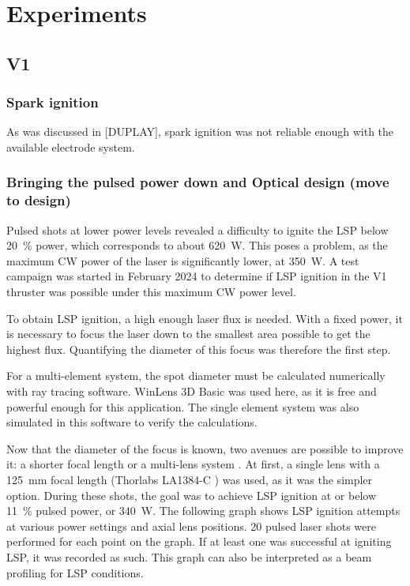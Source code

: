 \chapter{Experiments}

    \section{V1}

        \subsection{Spark ignition}
            
            As was discussed in [DUPLAY], spark ignition was not reliable enough with the available electrode system. 

        \subsection{Bringing the pulsed power down and Optical design (move to design)} \label{sec:design_optics}
            
            Pulsed shots at lower power levels revealed a difficulty to ignite the LSP below \qty{20}{\%} power, which corresponds to about \qty{620}{W}. This poses a problem, as the maximum CW power of the laser is significantly lower, at \qty{350}{W}. A test campaign was started in February 2024 to determine if LSP ignition in the V1 thruster was possible under this maximum CW power level.
            
            To obtain LSP ignition, a high enough laser flux is needed. With a fixed power, it is necessary to focus the laser down to the smallest area possible to get the highest flux. Quantifying the diameter of this focus was therefore the first step. 


            For a multi-element system, the spot diameter must be calculated numerically with ray tracing software. WinLens 3D Basic \cite{winlens} was used here, as it is free and powerful enough for this application. The single element system was also simulated in this software to verify the calculations.

            Now that the diameter of the focus is known, two avenues are possible to improve it: a shorter focal length or a multi-lens system \cite{thorlabs}. At first, a single lens with a \qty{125}{mm} focal length (Thorlabs LA1384-C \cite{125mm lens}) was used, as it was the simpler option. During these shots, the goal was to achieve LSP ignition at or below \qty{11}{\%} pulsed power, or \qty{340}{W}. The following graph shows LSP ignition attempts at various power settings and axial lens positions. 20 pulsed laser shots were performed for each point on the graph. If at least one was successful at igniting LSP, it was recorded as such. This graph can also be interpreted as a beam profiling for LSP conditions.
            
